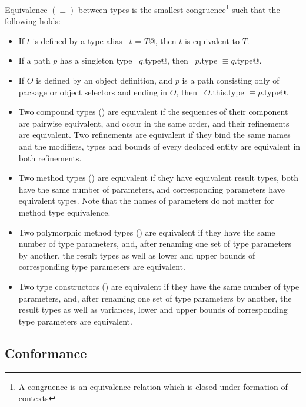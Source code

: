 Equivalence $(\equiv)$ between types is the smallest congruence\footnote{ A
congruence is an equivalence relation which is closed under formation
of contexts} such that the following holds:
\begin{itemize}
\item 
If $t$ is defined by a type alias ~\lstinline@type $t$ = $T$@, then $t$ is
equivalent to $T$.
\item
If a path $p$ has a singleton type ~\lstinline@$q$.type@, then
~\lstinline@$p$.type $\equiv q$.type@.
\item
If $O$ is defined by an object definition, and $p$ is a path
consisting only of package or object selectors and ending in $O$, then
~\lstinline@$O$.this.type $\equiv p$.type@.
\item
Two compound types () are equivalent if the sequences of their component
are pairwise equivalent, and occur in the same order, and their
refinements are equivalent. Two refinements are equivalent if they
bind the same names and the modifiers, types and bounds of every
declared entity are equivalent in both refinements.
\item
Two method types () are equivalent if they have equivalent result types,
both have the same number of parameters, and corresponding parameters
have equivalent types.  Note that the names of parameters do not
matter for method type equivalence.
\item 
Two polymorphic method types () are equivalent if they have the same number of
type parameters, and, after renaming one set of type parameters by
another, the result types as well as lower and upper bounds of
corresponding type parameters are equivalent.
\item %
Two type constructors () are equivalent if they have the 
same number of type parameters, and, after renaming one set of type parameters by
another, the result types as well as variances, lower and upper bounds of
corresponding type parameters are equivalent.
\end{itemize}

\subsection{Conformance}
\label{sec:conformance}

